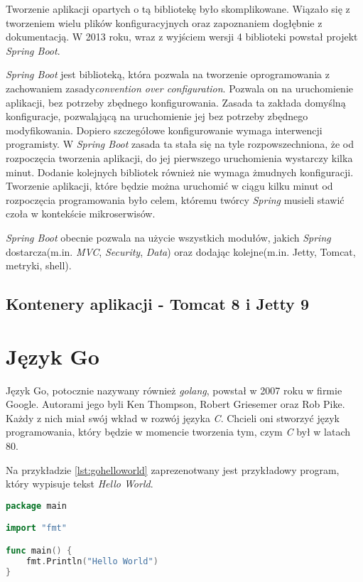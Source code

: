 Tworzenie aplikacji opartych o tą bibliotekę było skomplikowane. Wiązało się z tworzeniem wielu plików konfiguracyjnych oraz zapoznaniem dogłębnie z dokumentacją. W 2013 roku, wraz z wyjściem wersji 4 biblioteki powstał projekt \textsl{Spring Boot}. 

\textsl{Spring Boot} jest biblioteką, która pozwala na tworzenie oprogramowania z zachowaniem zasady\textsl{convention over configuration}. Pozwala on na uruchomienie aplikacji, bez potrzeby zbędnego konfigurowania. Zasada ta zakłada domyślną konfiguracje, pozwaląjącą na uruchomienie jej bez potrzeby zbędnego modyfikowania. Dopiero szczegółowe konfigurowanie wymaga interwencji programisty. W \textsl{Spring Boot} zasada ta stała się na tyle rozpowszechniona, że od rozpoczęcia tworzenia aplikacji, do jej pierwszego uruchomienia wystarczy kilka minut. Dodanie kolejnych bibliotek również nie wymaga żmudnych konfiguracji. Tworzenie aplikacji, które będzie można uruchomić w ciągu kilku minut od rozpoczęcia programowania było celem, któremu twórcy \textsl{Spring} musieli stawić czoła w kontekście mikroserwisów. 

\textsl{Spring Boot} obecnie pozwala na użycie wszystkich modułów, jakich \textsl{Spring} dostarcza(m.in. \textsl{MVC}, \textsl{Security}, \textsl{Data}) oraz dodając kolejne(m.in. Jetty, Tomcat, metryki, shell). 

\subsection{Kontenery aplikacji - Tomcat 8 i Jetty 9} 

\section{Język Go}
Język Go, potocznie nazywany również \textsl{golang}, powstał w 2007 roku w firmie Google. Autorami jego byli Ken Thompson, Robert Griesemer oraz Rob Pike\cite{programmingingo}. Każdy z nich miał swój wkład w rozwój języka \textsl{C}. Chcieli oni stworzyć język programowania, który będzie w momencie tworzenia tym, czym \textsl{C} był w latach 80.

Na przykładzie \ref{lst:gohelloworld} zaprezenotwany jest przykładowy program, który wypisuje tekst \textsl{Hello World}.
\begin{lstlisting}[language=Go, caption={Przykład programu w języku Go}, label={lst:gohelloworld}]
package main

import "fmt"

func main() {
	fmt.Println("Hello World")
}
\end{lstlisting}

